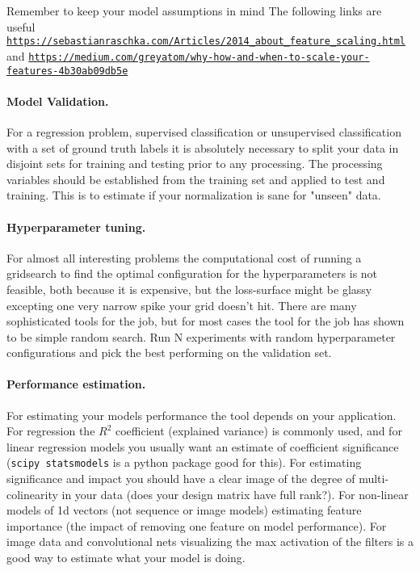 \documentclass[%
oneside,                 %
final,                   %
10pt]{article}
\begin{document}
Remember to keep your model assumptions in mind
The following links are useful \href{{https://sebastianraschka.com/Articles/2014_about_feature_scaling.html}}{\nolinkurl{https://sebastianraschka.com/Articles/2014_about_feature_scaling.html}} and  \href{{https://medium.com/greyatom/why-how-and-when-to-scale-your-features-4b30ab09db5e}}{\nolinkurl{https://medium.com/greyatom/why-how-and-when-to-scale-your-features-4b30ab09db5e}}

\paragraph{Model Validation.}
For a regression problem, supervised classification or unsupervised
classification with a set of ground truth labels it is absolutely
necessary to split your data in disjoint sets for training and testing
prior to any processing. The processing variables should be
established from the training set and applied to test and
training. This is to estimate if your normalization is sane for
"unseen" data.

\paragraph{Hyperparameter tuning.}
For almost all interesting problems the computational cost of running
a gridsearch to find the optimal configuration for the hyperparameters
is not feasible, both because it is expensive, but the loss-surface
might be glassy excepting one very narrow spike your grid doesn't
hit. There are many sophisticated tools for the job, but for most
cases the tool for the job has shown to be simple random search. Run N
experiments with random hyperparameter configurations and pick the
best performing on the validation set.

\paragraph{Performance estimation.}
For estimating your models performance the tool depends on your
application. For regression the $R^2$ coefficient (explained variance)
is commonly used, and for linear regression models you usually want an
estimate of coefficient significance (\texttt{scipy statsmodels} is a python
package good for this). For estimating significance and impact you
should have a clear image of the degree of multi-colinearity in your
data (does your design matrix have full rank?). For non-linear models
of 1d vectors (not sequence or image models) estimating feature
importance (the impact of removing one feature on model
performance). For image data and convolutional nets visualizing the
max activation of the filters is a good way to estimate what your
model is doing.
\end{document}

